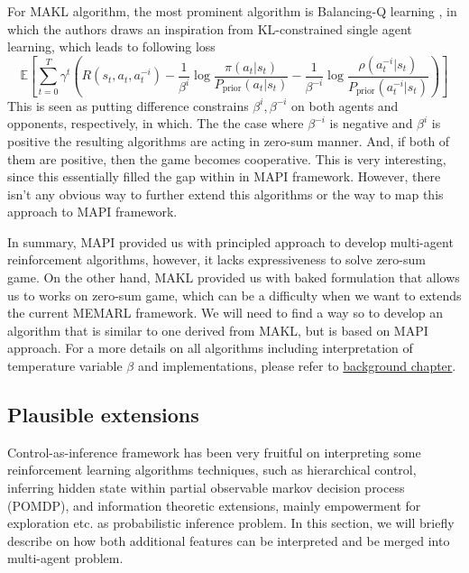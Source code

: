 For MAKL algorithm, the most prominent algorithm is Balancing-Q learning \cite{grau2018balancing}, in which the authors draws an inspiration from KL-constrained single agent learning, which leads to following loss 
\begin{equation*}
    \mathbb{E}\left[ \sum^T_{t=0} \gamma^t \left(R(s_t, a_t, a^{-i}_t) - \frac{1}{\beta^i} \log\frac{\pi(a_t|s_t)}{P_{\operatorname{prior}}(a_t|s_t)} - \frac{1}{\beta^{-i}}\log \frac{\rho(a^{-i}_t|s_t)}{P_{\operatorname{prior}}(a^{-i}_t|s_t)} \right) \right]
\end{equation*}
This is seen as putting difference constrains $\beta^i, \beta^{-i}$ on both agents and opponents, respectively, in which. The the case where $\beta^{-i}$ is negative and $\beta^i$ is positive the resulting algorithms are acting in zero-sum manner. And, if both of them are positive, then the game becomes cooperative. This is very interesting, since this essentially filled the gap within in MAPI framework. However, there isn't any obvious way to further extend this algorithms or the way to map this approach to MAPI framework.

In summary, MAPI provided us with principled approach to develop multi-agent reinforcement algorithms, however, it lacks expressiveness to solve zero-sum game. On the other hand, MAKL provided us with baked formulation that allows us to works on zero-sum game, which can be a difficulty when we want to extends the current MEMARL framework. We will need to find a way so to develop an algorithm that is similar to one derived from MAKL, but is based on MAPI approach. For a more details on all algorithms including interpretation of temperature variable $\beta$ and implementations, please refer to \hyperref[chapter:chap1]{background chapter}.


\subsection{Plausible extensions}
Control-as-inference framework has been very fruitful on interpreting some reinforcement learning algorithms techniques, such as hierarchical control, inferring hidden state within partial observable markov decision process (POMDP), and information theoretic extensions, mainly empowerment for exploration etc. as probabilistic inference problem. In this section, we will briefly describe on how both additional features can be interpreted and be merged into multi-agent problem.

